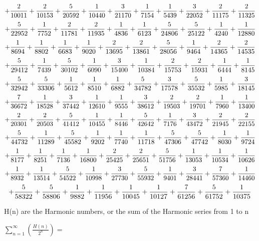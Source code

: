 \documentclass{article}
\begin{document}
$$+  {2\over 10011}  +  {2\over 10153}  +  {5\over 20592}  +  {1\over 10440}  +  {3\over 21170}  +  {1\over 7154}  +  {1\over 5439}  +  {3\over 22052}  +  {2\over 11175}  +  {2\over 11325}  $$
$$+  {5\over 22952}  +  {1\over 7752}  +  {2\over 11781}  +  {2\over 11935}  +  {1\over 4836}  +  {1\over 6123}  +  {5\over 24806}  +  {5\over 25122}  +  {1\over 4240}  +  {1\over 12880}  $$
$$+  {1\over 8694}  +  {1\over 8802}  +  {1\over 6683}  +  {1\over 9020}  +  {2\over 13695}  +  {2\over 13861}  +  {5\over 28056}  +  {1\over 9464}  +  {2\over 14365}  +  {2\over 14535}  $$
$$+  {5\over 29412}  +  {1\over 7439}  +  {5\over 30102}  +  {1\over 6090}  +  {3\over 15400}  +  {1\over 10384}  +  {2\over 15753}  +  {2\over 15931}  +  {1\over 6444}  +  {1\over 8145}  $$
$$+  {5\over 32942}  +  {5\over 33306}  +  {1\over 5612}  +  {1\over 8510}  +  {1\over 6882}  +  {5\over 34782}  +  {3\over 17578}  +  {5\over 35532}  +  {1\over 5985}  +  {3\over 18145}  $$
$$+  {7\over 36672}  +  {1\over 18528}  +  {3\over 37442}  +  {1\over 12610}  +  {1\over 9555}  +  {3\over 38612}  +  {2\over 19503}  +  {2\over 19701}  +  {1\over 7960}  +  {1\over 13400}  $$
$$+  {2\over 20301}  +  {2\over 20503}  +  {5\over 41412}  +  {1\over 10455}  +  {1\over 8446}  +  {5\over 42642}  +  {1\over 7176}  +  {3\over 43472}  +  {2\over 21945}  +  {2\over 22155}  $$
$$+  {5\over 44732}  +  {1\over 11289}  +  {5\over 45582}  +  {1\over 9202}  +  {1\over 7740}  +  {1\over 11718}  +  {5\over 47306}  +  {5\over 47742}  +  {1\over 8030}  +  {1\over 9724}  $$
$$+  {1\over 8177}  +  {1\over 8251}  +  {1\over 7136}  +  {1\over 16800}  +  {2\over 25425}  +  {2\over 25651}  +  {5\over 51756}  +  {1\over 13053}  +  {1\over 10534}  +  {1\over 10626}  $$
$$+  {1\over 8932}  +  {1\over 13514}  +  {5\over 54522}  +  {1\over 10998}  +  {3\over 27730}  +  {5\over 55932}  +  {1\over 9401}  +  {3\over 28441}  +  {7\over 57360}  +  {1\over 14460}  $$
$$+  {5\over 58322}  +  {5\over 58806}  +  {1\over 9882}  +  {1\over 11956}  +  {1\over 10045}  +  {1\over 10127}  +  {7\over 61256}  +  {5\over 61752}  +  {1\over 10375}  $$

\bigskip
H(n) are the Harmonic numbers, or the sum of the Harmonic series from 1 to n

\bigskip
$\sum_{n=1}^\infty \left( \frac{H(n)}{2^n} \right)=$
\end{document}
